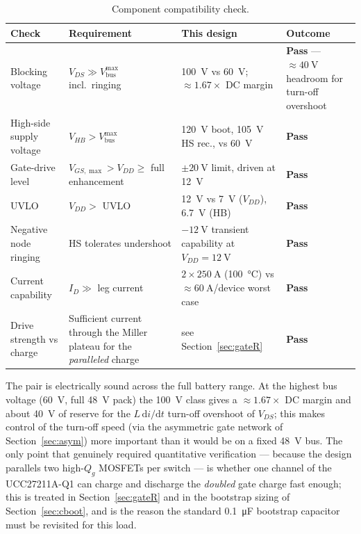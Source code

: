 \documentclass[journal,onecolumn,11pt]{IEEEtran}
\newcommand{\Vbus}{V_{\mathrm{bus}}}
\begin{document}
\begin{table}[!t]
\centering
\caption{Component compatibility check.}
\label{tab:compat}
\renewcommand{\arraystretch}{1.25}
\begin{tabularx}{\textwidth}{@{}L L L >{\raggedright\arraybackslash}p{2.3cm}@{}}
\toprule
\textbf{Check} & \textbf{Requirement} & \textbf{This design} & \textbf{Outcome} \\
\midrule
Blocking voltage & $V_{DS}\gg\Vbus^{\max}$ incl.\ ringing & \SI{100}{\volt} vs \SI{60}{\volt}; $\approx1.67\times$ DC margin & \textbf{Pass} --- $\approx\SI{40}{\volt}$ headroom for turn-off overshoot~\cite{ipt015ds} \\
High-side supply voltage & $V_{HB}>\Vbus^{\max}$ & \SI{120}{\volt} boot, \SI{105}{\volt} HS rec., vs \SI{60}{\volt} & \textbf{Pass}~\cite{ucc27211} \\
Gate-drive level & $V_{GS,\max}>V_{DD}\ge$ full enhancement & $\pm\SI{20}{\volt}$ limit, driven at \SI{12}{\volt} & \textbf{Pass}~\cite{ipt015ds,ucc27211} \\
UVLO & $V_{DD}>$ UVLO & \SI{12}{\volt} vs \SI{7}{\volt} ($V_{DD}$), \SI{6.7}{\volt} (HB) & \textbf{Pass}~\cite{ucc27211} \\
Negative node ringing & HS tolerates undershoot & $-\SI{12}{\volt}$ transient capability at $V_{DD}=\SI{12}{\volt}$ & \textbf{Pass}~\cite{ucc27211} \\
Current capability & $I_D\gg$ leg current & $2\times\SI{250}{\ampere}$ (\SI{100}{\celsius}) vs $\approx\SI{60}{\ampere}$/device worst case & \textbf{Pass}~\cite{ipt015ds} \\
Drive strength vs charge & Sufficient current through the Miller plateau for the \emph{paralleled} charge & see Section~\ref{sec:gateR} & \textbf{Pass} \\
\bottomrule
\end{tabularx}
\end{table}

The pair is electrically sound across the full battery range. At the highest bus voltage
(\SI{60}{\volt}, full \SI{48}{\volt} pack) the \SI{100}{\volt} class gives a $\approx1.67\times$ DC
margin and about \SI{40}{\volt} of reserve for the $L\,\mathrm{d}i/\mathrm{d}t$ turn-off overshoot
of $V_{DS}$; this makes control of the turn-off speed (via the asymmetric gate network of
Section~\ref{sec:asym}) more important than it would be on a fixed \SI{48}{\volt} bus. The only
point that genuinely required quantitative verification --- because the design parallels two
high-$Q_g$ MOSFETs per switch --- is whether one channel of the UCC27211A-Q1 can charge and
discharge the \emph{doubled} gate charge fast enough; this is treated in Section~\ref{sec:gateR}
and in the bootstrap sizing of Section~\ref{sec:cboot}, and is the reason the standard
\SI{0.1}{\micro\farad} bootstrap capacitor must be revisited for this load.
\end{document}

